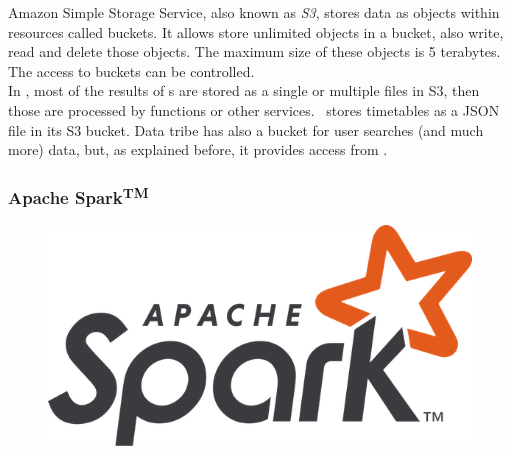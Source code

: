 Amazon Simple Storage Service\cite{s3}, also known as \textit{S3}, stores data as objects within resources called buckets. It allows store unlimited objects in a bucket, also write, read and delete those objects. The maximum size of these objects is 5 terabytes. The access to buckets can be controlled.
\\
In \company, most of the results of s are stored as a single or multiple files in S3, then those are processed by  functions or other services. \squad\ stores timetables as a JSON\cite{json} file in its S3 bucket. Data tribe has also a bucket for user searches (and much more) data, but, as explained before, it provides access from .

\subsubsection*{Apache Spark\textsuperscript{TM}} \label{apache_spark}

\begin{figure}[H]
\includegraphics[scale=0.1]{resources/apache-spark_logo.png}
\end{figure}

